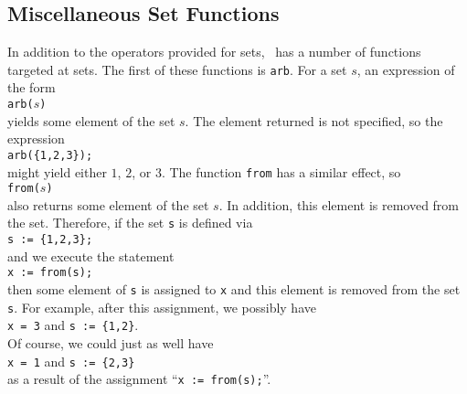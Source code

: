 \subsection{Miscellaneous Set Functions}
In addition to the operators provided for sets, \setlx\ has a number of functions targeted at sets.
The first of these functions is \texttt{arb}.  For a set $s$,  an expression of the form
\\[0.2cm]
\hspace*{1.3cm}
\texttt{arb($s$)}
\\[0.2cm]
yields some element of the set $s$.  The element returned is not specified, so the expression
\\[0.2cm]
\hspace*{1.3cm}
\texttt{arb(\{1,2,3\});}
\\[0.2cm]
might yield either $1$, $2$, or $3$. 
 The function \texttt{from} has a similar effect, so
\\[0.2cm]
\hspace*{1.3cm}
\texttt{from($s$)}
\\[0.2cm]
also returns some element of the set $s$.  In addition, this element is removed from the set.
Therefore, if the set \texttt{s} is defined via
\\[0.2cm]
\hspace*{1.3cm}
\texttt{s := \{1,2,3\};}
\\[0.2cm]
and we execute the statement 
\\[0.2cm]
\hspace*{1.3cm}
\texttt{x := from(s);}
\\[0.2cm]
then some element of \texttt{s} is assigned to \texttt{x} and this element is removed from 
the set \texttt{s}.  For example, after this assignment, we possibly have
\\[0.2cm]
\hspace*{1.3cm}
\texttt{x = 3} \quad and \quad \texttt{s := \{1,2\}}.
\\[0.2cm]
Of course, we could just as well have
\\[0.2cm]
\hspace*{1.3cm}
\texttt{x = 1} \quad and \quad \texttt{s := \{2,3\}}
\\[0.2cm]
as a result of the assignment ``\texttt{x := from(s);}''.

